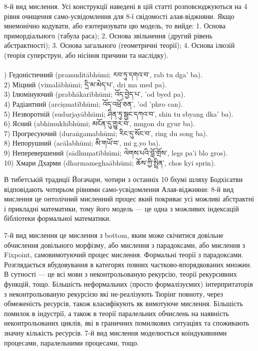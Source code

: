 8-й вид мислення. Усі конструкції наведені в цій статті розповсюджуються на 4 рівня
очищення само-усвідомлення для 8-ї свідомості алая-віджняни. Якщо мнемонічно кодувати,
або езотеризувати цю модель, то вийде: 1. Основа примордіального (табула раса);
2. Основа звільнення (другий рівень абстрактності); 3. Основа загального (геометричні теорії);
4. Основа ілюзій (теорія суперструн, або нісіння причини та наслідку).
\\
\\
\footnotesize
{}) Гедоністичний (pramuditābhūmi; \ti རབ་ཏུ་དགའ་བ་,  \ua rab tu dga' ba).\\
2) Міцний (vimalābhūmi; \ti དྲི་མ་མེད་པ་, \ua dri ma med pa).\\
3) Ілюмінуючий (prabhākarībhūmi; \ti འོད་བྱེད་པ་, \ua 'od byed pa).\\
4) Радіантний (arciṣmatībhūmi; \ti འོད་འཕྲོ་ཅན་, \ua 'od 'phro can).\\
5) Незворотній (sudurjayābhūmi; \ti ཤིན་ཏུ་སྦྱང་དཀའ་བ་, \ua shin tu sbyang dka' ba).\\
6) Ясний (abhimukhībhūmi; \ti མངོན་དུ་གྱུར་བ་, \ua mngon du gyur ba).\\
7) Прогресуючий (duraṅgamabhūmi; \ti རིང་དུ་སོང་བ་, \ua ring du song ba).\\
8) Непорушний (acālabhūmi; \ti མི་གཡོ་བ་, \ua mi g.yo ba).\\
9) Неперевершений (sādhuṃatībhūmi; \ti ལེགས་པའི་བློ་གྲོས་, \ua legs pa'i blo gros).\\
10) Хмари Дхарми (dharmameghaābhūmi; \ti ཆོས་ཀྱི་སྤྲིན་, \ua chos kyi sprin).\\
\normalsize

В тибетській традиції Йогачари, чотири з останніх 10 бхумі шляху Бодхісатви відповідають
чотирьом рівнями само-усвідомлення Алая-віджняни: 8-й вид мислення це онтолічний мисленний
процес який покриває усі можливі абстрактні і прикладні математики, тому його модель ---
це одна з можливих індексацій бібліотеки формальної математики.

7-й вид мислення це мислення з bottom, яким може скічитися довільне обчислення довільного морфізму,
або мислення з парадоксами, або мислення з Fixpoint, самовимотуючий процес мислення. Формальні
теорії з парадоксами. Розглядається вбудовування в категорях повних частково-впорядкованих множин.
В сутності --- це всі мови з неконтрольованую рекурсію, теорії рекурсивних функцій, тощо.
Більшість неформальних (просто формалізуємих) інтерпритаторів з неконтрольованую рекурсією
які не-реалізують Тюрінг повноту, через обмеженість ресурсів, також класифікують як вимотуюче
мислення. Більшість помилок в індустрії, а також в теорії паралельних обчислень на наявність
неконтрольованих циклів, які в граничних помилкових ситуаціях та споживають значну кількість
ресурсів. 7-й вид мислення моделюється коіндукивними процесами, паралельними процесами, тощо.

